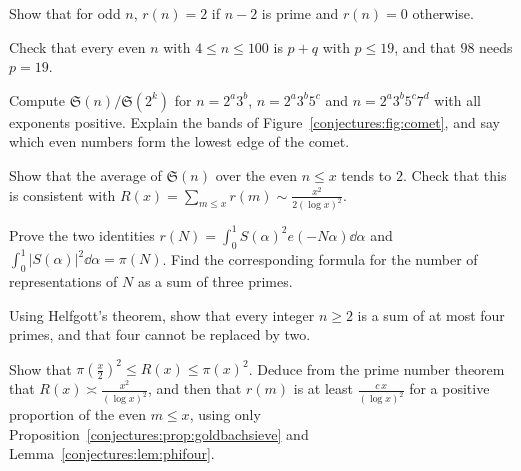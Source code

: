 \begin{exercise}[$\star$]\label{conjectures:ex:oddr}
Show that for odd $n$, $r(n)=2$ if $n-2$ is prime and $r(n)=0$ otherwise.
\end{exercise}

\begin{exercise}[$\star$]\label{conjectures:ex:smallgoldbach}
Check that every even $n$ with $4\le n\le100$ is $p+q$ with $p\le19$, and that $98$ needs $p=19$.
\end{exercise}

\begin{exercise}[$\star$]\label{conjectures:ex:bands}
Compute $\mathfrak S(n)/\mathfrak S(2^k)$ for $n=2^a3^b$, $n=2^a3^b5^c$ and $n=2^a3^b5^c7^d$ with all exponents positive. Explain the bands of
Figure~\ref{conjectures:fig:comet}, and say which even numbers form the lowest edge of the comet.
\end{exercise}

\begin{exercise}[$\star\star$]\label{conjectures:ex:singavg}
Show that the average of $\mathfrak S(n)$ over the even $n\le x$ tends to $2$. Check that this is consistent with $R(x)=\sum_{m\le x}r(m)\sim\frac{x^2}{2(\log x)^2}$.
\end{exercise}

\begin{exercise}[$\star$]\label{conjectures:ex:parseval}
Prove the two identities $r(N)=\int_0^1S(\alpha)^2e(-N\alpha)\dd\alpha$ and $\int_0^1|S(\alpha)|^2\dd\alpha=\pi(N)$. Find the corresponding formula for the
number of representations of $N$ as a sum of three primes.
\end{exercise}

\begin{exercise}[$\star$]\label{conjectures:ex:fourprimes}
Using Helfgott's theorem, show that every integer $n\ge2$ is a sum of at most four primes, and that four cannot be replaced by two.
\end{exercise}

\begin{exercise}[$\star\star$]\label{conjectures:ex:sumbounds}
Show that $\pi(\frac x2)^2\le R(x)\le\pi(x)^2$. Deduce from the prime number theorem that $R(x)\asymp\frac{x^2}{(\log x)^2}$, and then that $r(m)$ is at least
$\frac{c\,x}{(\log x)^2}$ for a positive proportion of the even $m\le x$, using only Proposition~\ref{conjectures:prop:goldbachsieve} and Lemma~\ref{conjectures:lem:phifour}.
\end{exercise}

